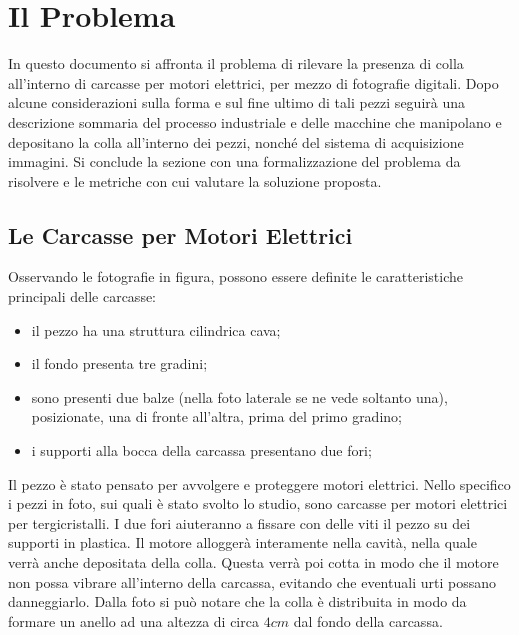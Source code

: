 
\chapter{Il Problema}



In questo documento si affronta il problema di rilevare la presenza di colla all'interno di carcasse per motori elettrici, per mezzo di fotografie digitali.
Dopo alcune considerazioni sulla forma e sul fine ultimo di tali pezzi seguirà una descrizione sommaria del processo industriale e delle macchine che manipolano e depositano la colla all'interno dei pezzi, nonché del sistema di acquisizione immagini.
Si conclude la sezione con una formalizzazione del problema da risolvere e le metriche con cui valutare la soluzione proposta.

\section{Le Carcasse per Motori Elettrici}

Osservando le fotografie in figura, possono essere definite le caratteristiche principali delle carcasse:
\begin{itemize}
  \item il pezzo ha una struttura cilindrica cava;
  \item il fondo presenta tre gradini;
  \item sono presenti due balze (nella foto laterale se ne vede soltanto una), posizionate, una di fronte all'altra, prima del primo gradino;
  \item i supporti alla bocca della carcassa presentano due fori;
\end{itemize}
Il pezzo è stato pensato per avvolgere e proteggere motori elettrici.
Nello specifico i pezzi in foto, sui quali è stato svolto lo studio, sono carcasse per motori elettrici per tergicristalli.
I due fori aiuteranno a fissare con delle viti il pezzo su dei supporti in plastica.
Il motore alloggerà interamente nella cavità, nella quale verrà anche depositata della colla.
Questa verrà poi cotta in modo che il motore non possa vibrare all'interno della carcassa, evitando che eventuali urti possano danneggiarlo.
Dalla foto si può notare che la colla è distribuita in modo da formare un anello ad una altezza di circa $4cm$ dal fondo della carcassa.


